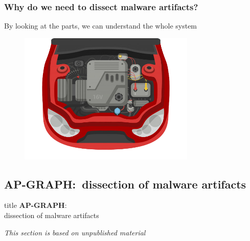 \begin{frame}
    \frametitle{Why do we need to dissect malware artifacts?}
    \centering

    \bigskip{}

    By looking at the parts, we can understand the whole system
    
    \bigskip{}

    \begin{figure}[!ht]
        \includegraphics[width=0.75\textwidth]{figures/apgraph/motor.png}
    \end{figure}

\end{frame}

\subsection[AP-GRAPH]{AP-GRAPH:~dissection of malware artifacts}

\begin{frame}
    \vfill
    \centering

    \begin{beamercolorbox}[sep=8pt,center,shadow=true,rounded=true]{title}
        \textbf{AP-GRAPH}:\\
        dissection of malware artifacts

        \small{}

        \bigskip{}

        \textit{This section is based on unpublished material}
    \end{beamercolorbox}

\end{frame}


